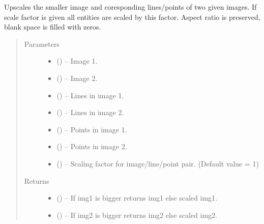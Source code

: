 \documentclass[letterpaper,10pt,english]{sphinxmanual}
\begin{document}
\begin{fulllineitems}
\label{\detokenize{image_helpers:image_helpers.scale}}
Upscales the smaller image and coresponding lines/points of two given images.
If scale factor is given all entities are scaled by this factor.
Aspect ratio is preserved, blank space is filled with zeros.
\begin{quote}\begin{description}
\item[{Parameters}] \leavevmode\begin{itemize}
\item {} 
 () -- Image 1.

\item {} 
 () -- Image 2.

\item {} 
 () -- Lines in image 1.

\item {} 
 () -- Lines in image 2.

\item {} 
 () -- Points in image 1.

\item {} 
 () -- Points in image 2.

\item {} 
 () -- Scaling factor for image/line/point pair.
(Default value = 1)

\end{itemize}

\item[{Returns}] \leavevmode
\begin{itemize}
\item {} 
 () -- If img1 is bigger returns img1 else scaled img1.

\item {} 
 () -- If img2 is bigger returns img2 else scaled img2.


\end{itemize}
\end{description}
\end{quote}
\end{fulllineitems}
\end{document}
